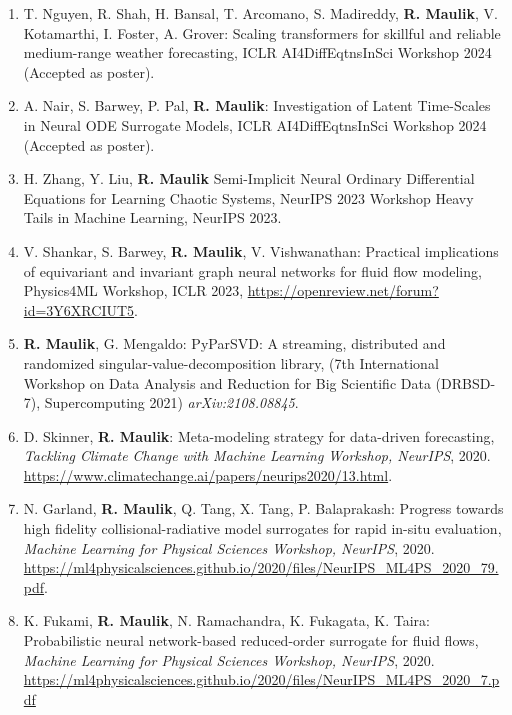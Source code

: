 \documentclass[letterpaper]{article}
\begin{document}
\begin{enumerate}

\item T. Nguyen, R. Shah, H. Bansal, T. Arcomano, S. Madireddy, \textbf{R. Maulik}, V. Kotamarthi, I. Foster, A. Grover: Scaling transformers for skillful and reliable medium-range weather forecasting, ICLR AI4DiffEqtnsInSci Workshop 2024 (Accepted as poster).

\item A. Nair, S. Barwey, P. Pal, \textbf{R. Maulik}: Investigation of Latent Time-Scales in Neural ODE Surrogate Models, ICLR AI4DiffEqtnsInSci Workshop 2024 (Accepted as poster).

\item H. Zhang, Y. Liu, \textbf{R. Maulik} Semi-Implicit Neural Ordinary Differential Equations for Learning Chaotic Systems, NeurIPS 2023 Workshop Heavy Tails in Machine Learning, NeurIPS 2023.

\item V. Shankar, S. Barwey, \textbf{R. Maulik}, V. Vishwanathan: Practical implications of equivariant and invariant graph neural networks for fluid flow modeling, Physics4ML Workshop, ICLR 2023, \url{https://openreview.net/forum?id=3Y6XRCIUT5}.

\item \textbf{R. Maulik}, G. Mengaldo: PyParSVD: A streaming, distributed and randomized singular-value-decomposition library, (7th International Workshop on Data Analysis and Reduction for Big Scientific Data (DRBSD-7), Supercomputing 2021) {\it arXiv:2108.08845}.

\item D. Skinner, \textbf{R. Maulik}: Meta-modeling strategy for data-driven forecasting, \textit{Tackling Climate Change with Machine Learning Workshop, NeurIPS}, 2020. \url{https://www.climatechange.ai/papers/neurips2020/13.html}. 

\item N. Garland, \textbf{R. Maulik}, Q. Tang, X. Tang, P. Balaprakash: Progress towards high fidelity collisional-radiative model surrogates for rapid in-situ evaluation, \textit{Machine Learning for Physical Sciences Workshop, NeurIPS}, 2020. \url{https://ml4physicalsciences.github.io/2020/files/NeurIPS_ML4PS_2020_79.pdf}.

\item K. Fukami, \textbf{R. Maulik}, N. Ramachandra, K. Fukagata, K. Taira: Probabilistic neural network-based reduced-order surrogate for fluid flows, \textit{Machine Learning for Physical Sciences Workshop, NeurIPS}, 2020. \url{https://ml4physicalsciences.github.io/2020/files/NeurIPS_ML4PS_2020_7.pdf}


\end{enumerate}
\end{document}
